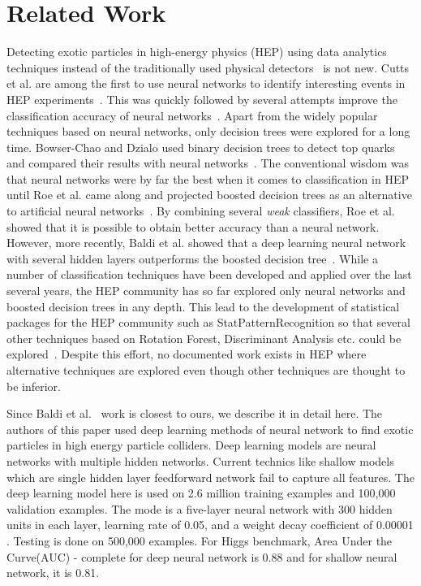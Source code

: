 \section{Related Work}
\label{sec:related}

Detecting exotic particles in high-energy physics (HEP) using data analytics techniques instead of the traditionally used physical detectors~\cite{detectors} is not new. Cutts et al. are among the first to use neural networks to identify interesting events in HEP experiments~\cite{Cutts-NN1}. This was quickly followed by several attempts  improve the classification accuracy of neural networks~\cite{NN2,NN3}. Apart from the widely popular techniques based on neural networks, only decision trees were explored for a long time. Bowser-Chao and Dzialo used binary decision trees to detect top quarks and compared their results with neural networks~\cite{Binary-DT}. The conventional wisdom was that neural networks were by far the best when it comes to classification in HEP until Roe et al. came along and projected boosted decision trees as an alternative to artificial neural networks~\cite{Boosted-DT}. By combining several \emph{weak} classifiers, Roe et al. showed that it is possible to obtain better accuracy than a neural network. However, more recently, Baldi et al. showed that a deep learning neural network with several hidden layers outperforms the boosted decision tree~\cite{DeepNN}. While a number of classification techniques have been developed and applied over the last several years, the HEP community has so far explored only neural networks and boosted decision trees in any depth. This lead to the development of statistical packages for the HEP community such as StatPatternRecognition so that several other techniques based on Rotation Forest, Discriminant Analysis etc. could be explored~\cite{StatPatternRecognition}. Despite this effort, no documented work exists in HEP where alternative techniques are explored even though other techniques are thought to be inferior.

Since Baldi et al.~\cite{DeepNN} work is closest to ours, we describe it in detail here. The authors of this paper used deep learning methods of neural network to find exotic particles in high energy particle colliders. Deep learning models are neural networks with multiple hidden networks. Current technics like shallow models which are single hidden layer feedforward network fail to capture all features.
The deep learning model here is used on 2.6 million training examples and 100,000 validation examples. The mode is a five-layer neural network with 300 hidden units in each layer, learning rate of 0.05, and a weight decay coefficient of 0.00001 . Testing is done on 500,000 examples. For Higgs benchmark, Area Under the Curve(AUC) - complete for deep neural network is 0.88 and for shallow neural network, it is 0.81.
